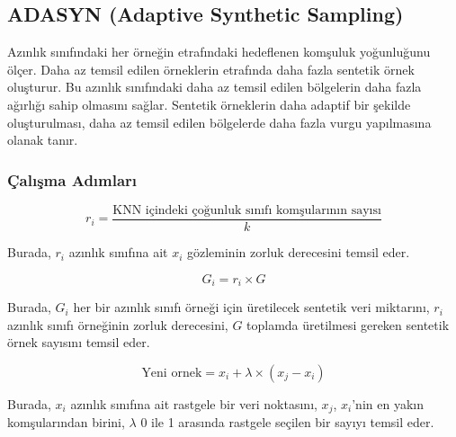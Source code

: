 \newpage

\subsection{ADASYN (Adaptive Synthetic Sampling)}
Azınlık sınıfındaki her örneğin etrafındaki hedeflenen komşuluk yoğunluğunu ölçer. Daha az temsil edilen örneklerin etrafında daha fazla sentetik örnek oluşturur. Bu azınlık sınıfındaki daha az temsil edilen bölgelerin daha fazla ağırlığı sahip olmasını sağlar. Sentetik örneklerin daha adaptif bir şekilde oluşturulması, daha az temsil edilen bölgelerde daha fazla vurgu yapılmasına olanak tanır.

\subsubsection{Çalışma Adımları}

\[ r_i = \frac{\text{KNN içindeki çoğunluk sınıfı komşularının sayısı}}{k} \]

Burada, $r_i$ azınlık sınıfına ait $x_i$ gözleminin zorluk derecesini temsil eder.

\[ G_i = r_i \times G \]

Burada, $G_i$ her bir azınlık sınıfı örneği için üretilecek sentetik veri miktarını, $r_i$ azınlık sınıfı örneğinin zorluk derecesini, $G$ toplamda üretilmesi gereken sentetik örnek sayısını temsil eder.

\[ \text{Yeni ornek} = x_i + \lambda \times (x_j - x_i) \]

Burada, $x_i$ azınlık sınıfına ait rastgele bir veri noktasını, $x_j$, $x_i$'nin en yakın komşularından birini, $\lambda$ 0 ile 1 arasında rastgele seçilen bir sayıyı temsil eder.

